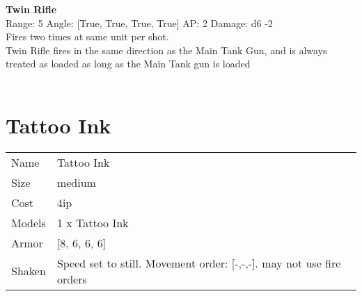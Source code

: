{\bf Twin Rifle } \\



Range: 5  Angle: [True, True, True, True] AP: 2 Damage: d6 -2 \\
Fires two times at same unit per shot.\\Twin Rifle fires in the same direction as the Main Tank Gun, and is always treated as loaded as long as the Main Tank gun is loaded\\ 




 
\ \\













\clearpage

\section{ Tattoo Ink }

\begin{tabular}{ll}
  Name & Tattoo Ink \\
  Size & medium\\
  Cost & 4ip\\
  Models & 1 x Tattoo Ink\\
  Armor & [8, 6, 6, 6]\\
  Shaken & Speed set to still. Movement order: [-,-,-]. may not use fire orders\\
\end{tabular}

\noindent 

